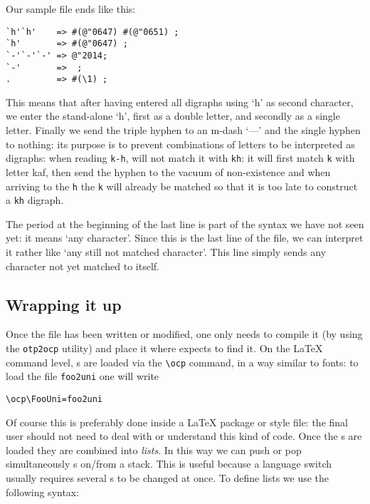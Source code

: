 \documentclass[a4paper,11pt]{article}
\begin{document}
Our sample file ends like this:

\begin{verbatim}
`h'`h'    => #(@"0647) #(@"0651) ;
`h'       => #(@"0647) ;
`-'`-'`-' => @"2014;
`-'       =>  ;
.         => #(\1) ;
\end{verbatim}

This means that after having entered all digraphs using `h' as second
character, we enter the stand-alone `h', first as a double letter, and
secondly as a single letter. Finally we send the triple hyphen to an
m-dash `---' and the single hyphen to nothing: its purpose is to
prevent combinations of letters to be interpreted as digraphs: when
reading \texttt{k-h}, \OMEGA{} will not match it with \texttt{kh}: it
will first match \texttt{k} with letter kaf, then send the hyphen to
the vacuum of non-existence and when arriving to the \texttt{h} the
\texttt{k} will already be matched so that it is too late to construct
a \texttt{kh} digraph.

The period at the beginning of the last line is part of the \OTP{}
syntax we have not seen yet: it means `any character'.  Since this is
the last line of the file, we can interpret it rather like `any still
not matched character'. This line simply sends any character not yet
matched to itself.

\subsection{Wrapping it up}

Once the \OTP{} file has been written or modified, one only needs to
compile it (by using the \texttt{otp2ocp} utility) and place it where
\OMEGA{} expects to find it. On the \LaTeX{} command level, \OTP{}s
are loaded via the \verb=\ocp= command, in a way similar to fonts: to
load the file \texttt{foo2uni} one will write

\begin{verbatim}
\ocp\FooUni=foo2uni
\end{verbatim}

Of course this is preferably done inside a \LaTeX{} package or style
file: the final user should not need to deal with or understand this
kind of code. Once the \OTP{}s are loaded they are combined into
\emph{lists}. In this way we can push or pop simultaneously \OTP{}s
on/from a stack. This is useful because a language switch usually
requires several \OTP{}s to be changed at once. To define \OTP{} lists
we use the following syntax:
\end{document}
